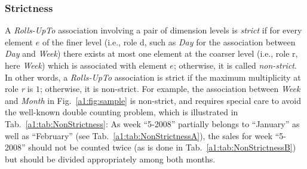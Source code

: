 \subsubsection{Strictness}
A \emph{Rolls-UpTo} association involving a pair of dimension levels
is \emph{strict} if for every element $e$ of the finer level (i.e.,
role d, such as \textit{Day} for the association between
\textit{Day} and \textit{Week}) there exists at most one element at
the coarser level (i.e., role r, here \textit{Week}) which is
associated with element $e$; otherwise, it is called
\emph{non-strict}.  In other words, a \emph{Rolls-UpTo} association
is strict if the maximum multiplicity at role \emph{r} is $1$;
otherwise, it is non-strict.  For example, the association between
\textit{Week} and \textit{Month} in Fig.~\ref{a1:fig:sample} is
non-strict, and requires special care to avoid the well-known double
counting problem, which is illustrated in
Tab.~\ref{a1:tab:NonStrictness}: As week ``5-2008'' partially
belongs to ``January'' as well as ``February'' (see
Tab.~\ref{a1:tab:NonStrictnessA}), the sales for week ``5-2008''
should not be counted twice (as is done in
Tab.~\ref{a1:tab:NonStrictnessB}) but should be divided
appropriately among both months.

\begin{table}
\centering \caption{Double counting problem for sales due to
non-strictness}
     \label{a1:tab:NonStrictness}
 \qquad\qquad {}
\end{table}


